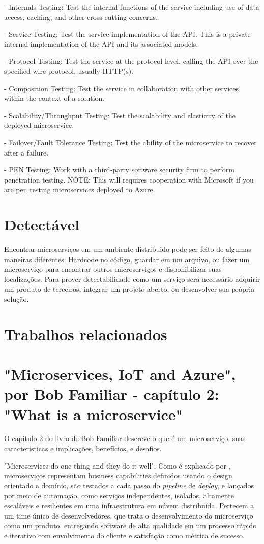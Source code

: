 - Internals Testing: Test the internal functions of the service including use of data access, caching, and other cross-cutting concerns.

- Service Testing: Test the service implementation of the API. This is a private internal implementation of the API and its associated models.

- Protocol Testing: Test the service at the protocol level, calling the API over the specified wire protocol, usually HTTP(s).

- Composition Testing: Test the service in collaboration with other services within the context of a solution.

- Scalability/Throughput Testing: Test the scalability and elasticity of the deployed microservice.

- Failover/Fault Tolerance Testing: Test the ability of the microservice to recover after a failure.

- PEN Testing: Work with a third-party software security firm to perform penetration testing. NOTE: This will requires cooperation with Microsoft if you are pen testing microservices deployed to Azure.

\section{Detectável}

Encontrar microserviços em um ambiente distribuido pode ser feito de algumas maneiras diferentes: Hardcode no código, guardar em um arquivo, ou fazer um microserviço para encontrar outros microserviços e disponibilizar suas localizações. Para prover detectabilidade como um serviço será necessário adquirir um produto de terceiros, integrar um projeto aberto, ou desenvolver sua própria solução.

\section{Trabalhos relacionados}

\section*{"Microservices, IoT and Azure", por Bob Familiar - capítulo 2: "What is a microservice"}

O capítulo 2 do livro de Bob Familiar descreve o que é um microserviço, suas características e implicações, benefícios, e desafios. 

"Microservices do one thing and they do it well". Como é explicado por  , microserviços representam business capabilities definidos usando o design orientado a domínio, são testados a cada passo do \emph{pipeline} de \emph{deploy}, e lançados por meio de automação, como serviços independentes, isolados, altamente escaláveis e resilientes em uma infraestrutura em núvem distribuída. Pertecem a um time único de desenvolvedores, que trata o desenvolvimento do microserviço como um produto, entregando software de alta qualidade em um processo rápido e iterativo com envolvimento do cliente e satisfação como métrica de sucesso.

